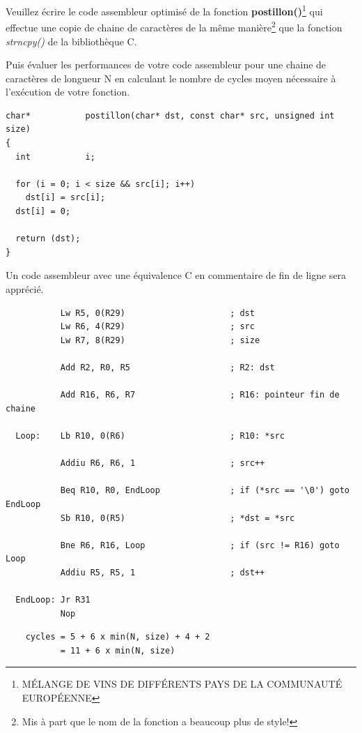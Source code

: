 {Veuillez \'ecrire le code assembleur optimis\'e de la fonction
\textbf{postillon()}\footnote{M\'ELANGE DE VINS DE DIFF\'ERENTS
                     PAYS DE LA COMMUNAUT\'E EUROP\'EENNE}
qui effectue une copie de chaine de caract\`eres de la m\^eme
mani\`ere\footnote{Mis \`a part que le nom de la fonction a
                   beaucoup plus de style!}
que la fonction \textit{strncpy()} de la biblioth\`eque C.

Puis \'evaluer les performances de votre code assembleur pour une chaine
de caract\`eres de longueur N en calculant le nombre de cycles moyen
n\'ecessaire \`a l'ex\'ecution de votre fonction.

\begin{verbatim}
char*           postillon(char* dst, const char* src, unsigned int size)
{
  int           i;

  for (i = 0; i < size && src[i]; i++)
    dst[i] = src[i];
  dst[i] = 0;

  return (dst);
}
\end{verbatim}

Un code assembleur avec une \'equivalence C en commentaire de fin de ligne
sera appr\'eci\'e.

\begin{correction}

  \begin{verbatim}
           Lw R5, 0(R29)                     ; dst
           Lw R6, 4(R29)                     ; src
           Lw R7, 8(R29)                     ; size

           Add R2, R0, R5                    ; R2: dst

           Add R16, R6, R7                   ; R16: pointeur fin de chaine

  Loop:    Lb R10, 0(R6)                     ; R10: *src

           Addiu R6, R6, 1                   ; src++

           Beq R10, R0, EndLoop              ; if (*src == '\0') goto EndLoop
           Sb R10, 0(R5)                     ; *dst = *src

           Bne R6, R16, Loop                 ; if (src != R16) goto Loop
           Addiu R5, R5, 1                   ; dst++

  EndLoop: Jr R31
           Nop
  \end{verbatim}

  \begin{verbatim}
    cycles = 5 + 6 x min(N, size) + 4 + 2
           = 11 + 6 x min(N, size)
  \end{verbatim}


\end{correction}}
